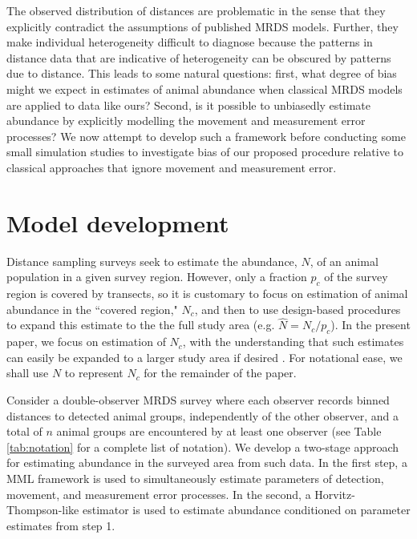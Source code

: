 \documentclass[aoas,preprint]{imsart}
\numberwithin{equation}{section}
\theoremstyle{plain}
\begin{document}
The observed distribution of distances are problematic in the sense that they explicitly contradict the assumptions of published MRDS models. Further, they make individual heterogeneity difficult to diagnose because the patterns in distance data that are indicative of heterogeneity can be obscured by patterns due to distance. This leads to some natural questions: first, what degree of bias might we expect in estimates of animal abundance when classical MRDS models are applied to data like ours?  Second, is it possible to unbiasedly estimate abundance by explicitly modelling the movement and measurement error processes?  We now attempt to develop such a framework before conducting some small simulation studies to investigate bias of our proposed procedure relative to classical approaches that ignore movement and measurement error.

\section{Model development}

Distance sampling surveys seek to estimate the abundance, $N$, of an animal population in a given survey region. However, only a fraction $p_c$ of the survey region is covered by transects, so it is customary to focus on estimation of animal abundance in the ``covered region," $N_c$, and then to use design-based procedures to expand this estimate to the the full study area (e.g. $\hat{N}=N_c/p_c$).  In the present paper, we focus on estimation of $N_c$, with the understanding that such estimates can easily be expanded to a larger study area if desired \citep[e.g.][]{BucklandEtAl2004}.  For notational ease, we shall use $N$ to represent $N_c$ for the remainder of the paper.

Consider a double-observer MRDS survey where each observer records binned distances to detected animal groups, independently of the other observer, and a total of $n$ animal groups are encountered by at least one observer (see Table \ref{tab:notation} for a complete list of notation).  We develop a two-stage approach for estimating abundance in the surveyed area from such data.  In the first step, a MML framework is used to simultaneously estimate parameters of detection, movement, and measurement error processes.  In the second, a Horvitz-Thompson-like estimator is used to estimate abundance conditioned on parameter estimates from step 1.
\end{document}
